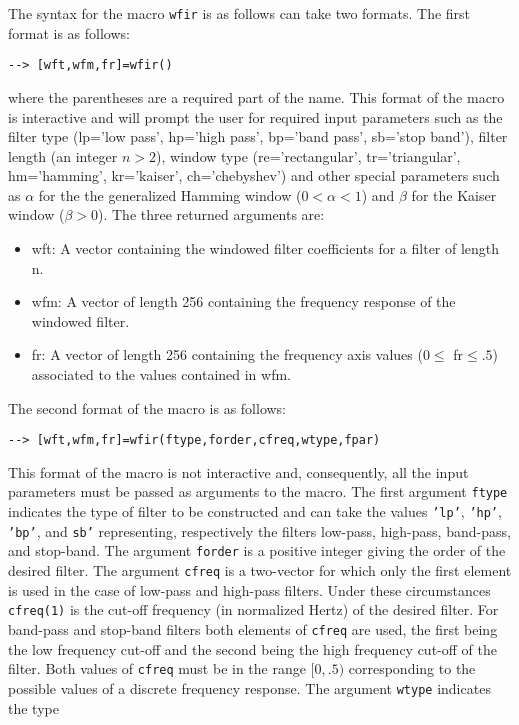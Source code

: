 	The syntax for the macro {\tt wfir} is as follows can take 
two formats.  The first format is as follows:
\begin{verbatim}
--> [wft,wfm,fr]=wfir()
\end{verbatim}
where the parentheses are a required part of the name.  
This format of the macro is interactive and will prompt the user for 
required input parameters such as the filter type (lp='low pass',
hp='high pass', bp='band pass', sb='stop band'),
filter length (an integer $n>2$), window type (re='rectangular',
tr='triangular', hm='hamming', kr='kaiser', ch='chebyshev')
and other special parameters such as $\alpha$ for the
the generalized Hamming window ($0<\alpha<1$) and $\beta$
for the Kaiser window ($\beta>0$).
The three returned arguments are:
%
\begin{itemize}
\item{wft:}
  A vector containing the windowed filter coefficients for a filter of length n.
\item{wfm:}
  A vector of length 256 containing the frequency response of the windowed 
  filter.
\item{fr:}
  A vector of length 256  containing the frequency axis values 
  ($0\le$ fr$\le .5$) associated to the values contained in wfm.
\end{itemize}
%
The second format of the macro is as follows:
\begin{verbatim}
--> [wft,wfm,fr]=wfir(ftype,forder,cfreq,wtype,fpar)
\end{verbatim}
This format of the macro is not interactive and, consequently, all
the input parameters must be passed as arguments to the macro.  
The first argument {\tt ftype} indicates the type of filter to
be constructed and can take the values {\tt 'lp'}, {\tt 'hp'},
{\tt 'bp'}, and {\tt sb'} representing, respectively the filters
low-pass, high-pass, band-pass, and stop-band.  
The argument {\tt forder} is a positive
integer giving the order of the desired filter.  The argument
{\tt cfreq} is a two-vector for which only the first element is
used in the case of low-pass and high-pass filters.  Under these
circumstances {\tt cfreq(1)} is the cut-off frequency (in normalized
Hertz) of the desired filter. For band-pass and stop-band filters
both elements of {\tt cfreq} are used, the first being the low
frequency cut-off and the second being the high frequency cut-off
of the filter.  Both values of {\tt cfreq} must be in the range
$[0,.5)$ corresponding to the possible values of a discrete
frequency response.  The argument {\tt wtype} indicates the type
